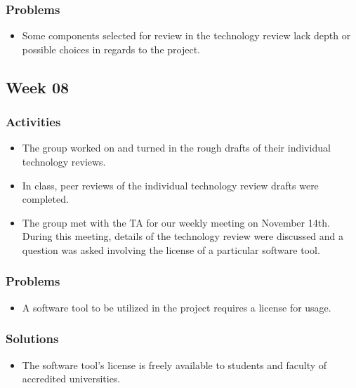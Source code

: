 \documentclass[letterpaper, onecolumn, draftclsnofoot, 10pt, compsoc]{IEEEtran}
\begin{document}
\begin{singlespace}
        \subsubsection{Problems}
        	\begin{itemize}
        	\item Some components selected for review in the technology review lack depth or possible choices in regards to the project. 
        	\end{itemize}
        
    \subsection{Week 08}
    	\subsubsection{Activities}
        	\begin{itemize}
        	\item The group worked on and turned in the rough drafts of their individual technology reviews.
            \item In class, peer reviews of the individual technology review drafts were completed.
            \item The group met with the TA for our weekly meeting on November 14th. During this meeting, details of the technology review were discussed and a question was asked involving the license of a particular software tool.
        	\end{itemize}
        \subsubsection{Problems}
        	\begin{itemize}
        	\item A software tool to be utilized in the project requires a license for usage.
        	\end{itemize}
        \subsubsection{Solutions}
        	\begin{itemize}
        	\item The software tool's license is freely available to students and faculty of accredited universities.
        	\end{itemize}
        

\end{singlespace}
\end{document}
